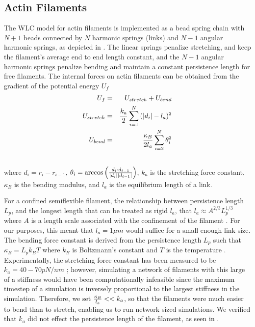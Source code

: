 \documentclass[12pt]{article}
\begin{document}
\subsection{Actin Filaments}
The WLC model for actin filaments is implemented as a bead spring chain with $N+1$ beads connected by $N$ harmonic
springs (links) and $N-1$ angular harmonic springs, as depicted in . The linear springs 
penalize stretching, and keep the filament's average end to end length constant, and the $N-1$ angular harmonic springs
penalize bending and maintain a constant persistence length for free filaments. 
The internal forces on actin filaments can be obtained from the gradient of the potential energy $U_f$
\begin{eqnarray}
  U_f &=& U_{stretch} + U_{bend}\\
  U_{stretch}&=&{k_a\over2}\sum_{i=1}^{N}{(|d_i| - l_a)^2}\\\nonumber
  U_{bend}&=&{\kappa_B\over 2l_a}\sum_{i=2}^N{\theta_i^2}\\\nonumber
  \label{eqn:Ufil}
\end{eqnarray}
where $d_i = r_i-r_{i-1}$, $\theta_i = \arccos{\left({d_i\cdot d_{i-1}\over |d_i||d_{i-1}|}\right)}$, $k_a$ is the
stretching force constant, $\kappa_B$ is the bending modulus, and $l_a$ is the equilibrium length of a
link. 
\par
For a confined semiflexible
filament, the relationship between persistence length $L_p$, and the longest length that can be treated as rigid
$l_a$, that $l_a\approx A^{2/3}L_p^{1/3}$ where $A$ is a length scale associated with the confinement of the
filament \cite{odijk1983}. For our purposes, this meant that $l_a = 1\mu m$ would suffice for a small enough link size.
The bending force constant is derived from the persistence length $L_p$ such that
$\kappa_B = L_p k_B T$ where $k_B$ is Boltzmann's constant and $T$ is the temperature \cite{rubinstein}. Experimentally,
the stretching force constant has been measured to be $k_a=40-70pN/nm$ \cite{kojima1994, higuchi1995}; however, simulating a
network of filaments with this large of a stiffness would have been computationally infeasible since the maximum timestep of a 
simulation is inversely
proportional to the largest stiffness in the simulation. Therefore, we set ${\kappa_B\over l_a} <<k_a$, so that the filaments
were much easier to bend than to stretch, enabling us to run network sized 
simulations. We verified that $k_a$ did not effect the persistence length of the filament, as seen in . 
\end{document}

